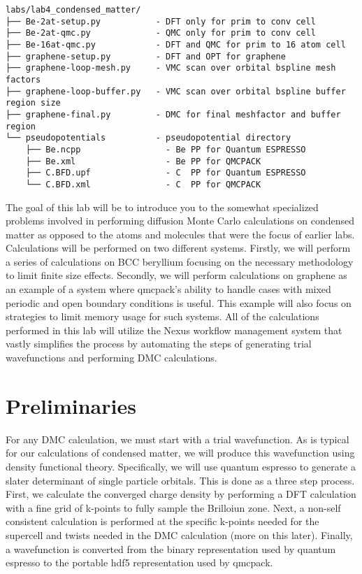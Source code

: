 \footnotesize
\begin{verbatim}
labs/lab4_condensed_matter/
├── Be-2at-setup.py           - DFT only for prim to conv cell
├── Be-2at-qmc.py             - QMC only for prim to conv cell
├── Be-16at-qmc.py            - DFT and QMC for prim to 16 atom cell
├── graphene-setup.py         - DFT and OPT for graphene
├── graphene-loop-mesh.py     - VMC scan over orbital bspline mesh factors
├── graphene-loop-buffer.py   - VMC scan over orbital bspline buffer region size
├── graphene-final.py         - DMC for final meshfactor and buffer region
└── pseudopotentials          - pseudopotential directory
    ├── Be.ncpp                 - Be PP for Quantum ESPRESSO
    ├── Be.xml                  - Be PP for QMCPACK
    ├── C.BFD.upf               - C  PP for Quantum ESPRESSO
    └── C.BFD.xml               - C  PP for QMCPACK
\end{verbatim}
\normalsize

The goal of this lab will be to introduce you to the somewhat specialized problems involved in performing diffusion Monte Carlo calculations on condensed matter as opposed to the atoms and molecules that were the focus of earlier labs.   Calculations will be performed on two different systems.  Firstly, we will perform a series of calculations on BCC beryllium focusing on the necessary methodology to limit finite size effects.  Secondly, we will perform calculations on graphene as an example of a system where qmcpack’s ability to handle cases with mixed periodic and open boundary conditions is useful.  This example will also focus on strategies to limit memory usage for such systems.
All of the calculations performed in this lab will utilize the Nexus workflow management system that vastly simplifies the process by automating the steps of generating trial wavefunctions and performing DMC calculations.

\newcommand{\vp}{\mathbf{a}^\text{p}}
\newcommand{\vs}{\mathbf{a}^\text{s}} 
\newcommand{\Smat}{\mathbf{S}}
\section{Preliminaries}
For any DMC calculation, we must start with a trial wavefunction. As is typical for our calculations of condensed matter, we will produce this wavefunction using density functional theory.  Specifically, we will use quantum espresso to generate a slater determinant of single particle orbitals.  This is done as a three step process.  First, we calculate the converged charge density by performing a DFT calculation with a fine grid of k-points to fully sample the Brilloiun zone.  Next, a non-self consistent calculation is performed at the specific k-points needed for the supercell and twists needed in the DMC calculation (more on this later).  Finally, a wavefunction is converted from the binary representation used by quantum espresso to the portable hdf5 representation used by qmcpack.

